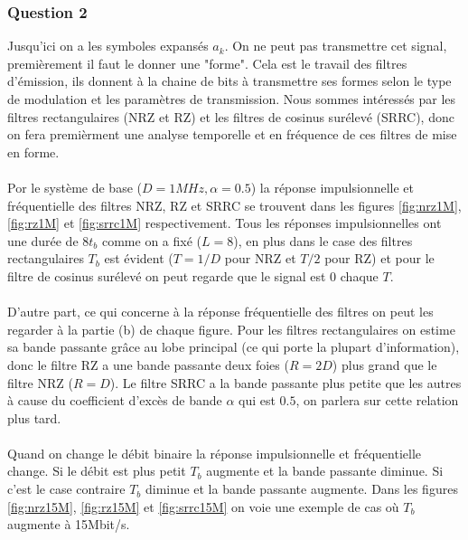 \documentclass[a4paper,11pt]{article}
\begin{document}
\subsubsection*{Question 2}
Jusqu'ici on a les symboles expansés $a_k$. On ne peut pas transmettre cet signal, premièrement il faut le donner une "forme". Cela est le travail des filtres d'émission, ils donnent à la chaine de bits à transmettre ses formes selon le type de modulation et les paramètres de transmission. Nous sommes intéressés par les filtres rectangulaires (NRZ et RZ) et les filtres de cosinus surélevé (SRRC), donc on fera premièrment une analyse temporelle et en fréquence de ces filtres de mise en forme.\\ \\

Por le système de base ($D=1MHz, \alpha=0.5$) la réponse impulsionnelle et fréquentielle des filtres NRZ, RZ et SRRC se trouvent dans les figures \ref{fig:nrz1M}, \ref{fig:rz1M} et \ref{fig:srrc1M} respectivement. Tous les réponses impulsionnelles ont une durée de $8 t_b$ comme on a fixé ($L=8$), en plus dans le case des filtres rectangulaires $T_b$ est évident ($T= 1/D$ pour NRZ et $T/2$ pour RZ) et pour le filtre de cosinus surélevé on peut regarde que le signal est 0 chaque $T$. \\ \\

D'autre part, ce qui concerne à la réponse fréquentielle des filtres on peut les regarder à la partie (b) de chaque figure. Pour les filtres rectangulaires on estime sa bande passante grâce au lobe principal (ce qui porte la plupart d'information), donc le filtre RZ a une bande passante deux foies ($R=2D$) plus grand que le filtre NRZ ($R=D$). Le filtre SRRC a la bande passante plus petite que les autres à cause du coefficient d'excès de bande $\alpha$ qui est $0.5$, on parlera sur cette relation plus tard.\\ \\

Quand on change le débit binaire la réponse impulsionnelle et fréquentielle change. Si le débit est plus petit $T_b$ augmente et la bande passante diminue. Si c'est le case contraire $T_b$ diminue et la bande passante augmente. Dans les figures \ref{fig:nrz15M}, \ref{fig:rz15M} et \ref{fig:srrc15M} on voie une exemple de cas où $T_b$ augmente à 15Mbit/s.
\end{document}
